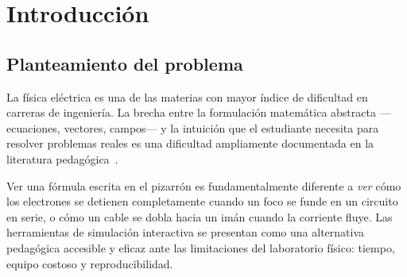 \documentclass[12pt, a4paper]{article}
\newcommand{\js}{\texttt{JavaScript}}
\newcommand{\mvc}{\textsc{mvc}}
\begin{document}
\begin{abstract}
\noindent
El presente trabajo documenta el diseño, desarrollo e implementación de
\textbf{ElectroLab-JS}, una aplicación web interactiva orientada a la
enseñanza visual de conceptos fundamentales de electricidad y magnetismo a
nivel universitario. El simulador cubre tres módulos: la Ley de Ohm con
análisis de riesgo térmico, topologías de circuitos eléctricos (serie,
paralelo y mixto) con simulación de fallas, y el electromagnetismo basado
en la Fuerza de Lorentz aplicado a un motor de corriente continua. La
herramienta fue construida con tecnologías web nativas ?HTML5, CSS3,
\js{} Vanilla y Canvas API? sin dependencias externas, bajo el patrón
\mvc{} y principios SOLID. Los conceptos simulados tienen sustento directo
en las prácticas de laboratorio realizadas durante el semestre, incluyendo
electrización por frotamiento, verificación experimental de la Ley de
Coulomb y fabricación de capacitores artesanales. Los resultados
demuestran que la representación visual animada de fenómenos físicos
facilita la comprensión de conceptos abstractos como la resistencia
equivalente, la distribución de corriente y la inducción electromagnética.

\bigskip
\noindent\textbf{Palabras clave:} Ley de Ohm, circuitos eléctricos,
fuerza de Lorentz, capacitancia, electrización, simulación web, Canvas API,
\js{}, educación en ingeniería.
\end{abstract}

\section{Introducción}

\subsection{Planteamiento del problema}

La física eléctrica es una de las materias con mayor índice de dificultad
en carreras de ingeniería. La brecha entre la formulación matemática
abstracta ---ecuaciones, vectores, campos--- y la intuición que el
estudiante necesita para resolver problemas reales es una dificultad
ampliamente documentada en la literatura pedagógica~\cite{serway2018,
hayt2019}.

Ver una fórmula escrita en el pizarrón es fundamentalmente diferente a
\emph{ver} cómo los electrones se detienen completamente cuando un foco se
funde en un circuito en serie, o cómo un cable se dobla hacia un imán
cuando la corriente fluye. Las herramientas de simulación interactiva se
presentan como una alternativa pedagógica accesible y eficaz ante las
limitaciones del laboratorio físico: tiempo, equipo costoso y
reproducibilidad.
\end{document}
